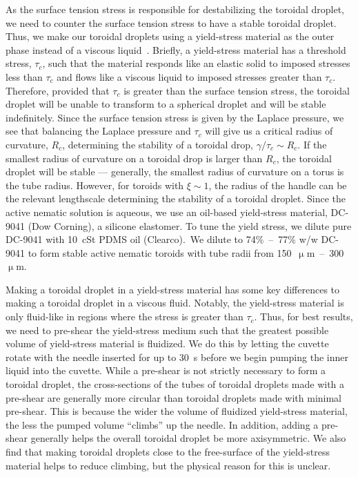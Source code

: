 As the surface tension stress is responsible for destabilizing the toroidal droplet, we need to counter the surface tension stress to have a stable toroidal droplet.
Thus, we make our toroidal droplets using a yield-stress material as the outer phase instead of a viscous liquid~\cite{RN47,RN258}.
Briefly, a yield-stress material has a threshold stress, $\tau_c$, such that the material responds like an elastic solid to imposed stresses less than $\tau_c$ and flows like a viscous liquid to imposed stresses greater than $\tau_c$.
Therefore, provided that $\tau_c$ is greater than the surface tension stress, the toroidal droplet will be unable to transform to a spherical droplet and will be stable indefinitely.
Since the surface tension stress is given by the Laplace pressure, we see that balancing the Laplace pressure and $\tau_c$ will give us a critical radius of curvature, $R_c$, determining the stability of a toroidal drop, $\gamma/\tau_c \sim R_c$.
If the smallest radius of curvature on a toroidal drop is larger than $R_c$, the toroidal droplet will be stable --- generally, the smallest radius of curvature on a torus is the tube radius.
However, for toroids with $\xi \sim 1$, the radius of the handle can be the relevant lengthscale determining the stability of a toroidal droplet.
Since the active nematic solution is aqueous, we use an oil-based yield-stress material, DC-9041 (Dow Corning), a silicone elastomer.
To tune the yield stress, we dilute pure DC-9041 with 10~cSt PDMS oil (Clearco).\
We dilute to 74\%~--~77\% w/w DC-9041 to form stable active nematic toroids with tube radii from 150~$\upmu$m~--~300~$\upmu$m.

Making a toroidal droplet in a yield-stress material has some key differences to making a toroidal droplet in a viscous fluid.
Notably, the yield-stress material is only fluid-like in regions where the stress is greater than $\tau_c$.
Thus, for best results, we need to pre-shear the yield-stress medium such that the greatest possible volume of yield-stress material is fluidized.
We do this by letting the cuvette rotate with the needle inserted for up to 30~s before we begin pumping the inner liquid into the cuvette.
While a pre-shear is not strictly necessary to form a toroidal droplet, the cross-sections of the tubes of toroidal droplets made with a pre-shear are generally more circular than toroidal droplets made with minimal pre-shear.
This is because the wider the volume of fluidized yield-stress material, the less the pumped volume ``climbs'' up the needle.
In addition, adding a pre-shear generally helps the overall toroidal droplet be more axisymmetric.
We also find that making toroidal droplets close to the free-surface of the yield-stress material helps to reduce climbing, but the physical reason for this is unclear.

